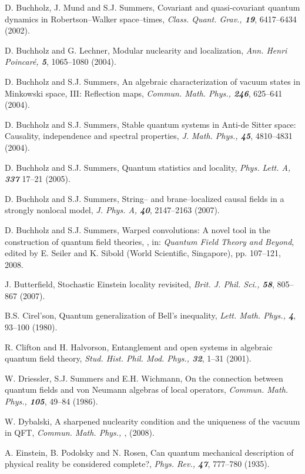 \documentclass[12pt]{article}
\begin{document}
\begin{thebibliography}{Bor}
D. Buchholz, J. Mund and S.J. Summers, Covariant and quasi-covariant
quantum dynamics in Robertson--Walker space--times, {\sl Class. Quant. 
Grav., \bf 19}, 6417--6434 (2002).

D. Buchholz and G. Lechner, Modular nuclearity and localization,
{\sl Ann. Henri Poincar\'e, \bf 5}, 1065--1080 (2004).

D. Buchholz and S.J. Summers, An algebraic characterization 
of vacuum states in Minkowski space, III: Reflection maps,
{\sl Commun. Math. Phys., \bf 246}, 625--641 (2004).

D. Buchholz and S.J. Summers, Stable quantum systems in Anti-de Sitter
space: Causality, independence and spectral properties, {\sl J. Math. Phys., 
\bf 45}, 4810--4831 (2004).

D. Buchholz and S.J. Summers, Quantum statistics and locality,
{\sl Phys. Lett. A, \bf 337} 17--21 (2005). 

D. Buchholz and S.J. Summers, String-- and brane--localized causal
fields in a strongly nonlocal model, {\sl J. Phys. A, \bf 40},
2147--2163 (2007).

D. Buchholz and S.J. Summers, Warped convolutions: A novel tool 
in the construction of quantum field theories, , in: {\it Quantum Field
Theory and Beyond}, edited by E. Seiler and K. Sibold (World Scientific,
Singapore), pp. 107--121, 2008.

J. Butterfield, Stochastic Einstein locality revisited, 
{\sl Brit. J. Phil. Sci., \bf 58}, 805--867 (2007).

B.S. Cirel'son, Quantum generalization of Bell's inequality, {\sl
Lett. Math. Phys., \bf 4}, 93--100 (1980).

R. Clifton and H. Halvorson, Entanglement and open systems in
algebraic quantum field theory, {\sl Stud. Hist. Phil. Mod. Phys.,
\bf 32}, 1--31 (2001).

W. Driessler, S.J. Summers and E.H. Wichmann, On the connection
between quantum fields and von Neumann algebras of local operators, {\sl
Commun. Math. Phys., \bf 105}, 49--84 (1986).

W. Dybalski, A sharpened nuclearity condition and the uniqueness
of the vacuum in QFT, {\sl Commun. Math. Phys., \bf }, (2008).

A. Einstein, B. Podolsky and N. Rosen, Can quantum mechanical description
of physical reality be considered complete?, {\sl Phys. Rev., \bf 47},
777--780 (1935).


\end{thebibliography}
\end{document}
